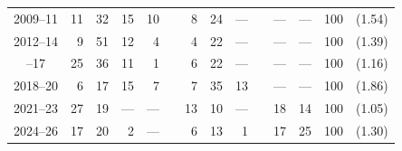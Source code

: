 \documentclass[letter,12pt]{article}
\begin{document}
\begin{table}
{\begin{tabular}{crrrrrrrrrrrrc}
 2009--11&  11 &  32 &  15 &    10    &&   8 &       24 &      --- &&   --- &      ---      & 100 & (1.54) \\
 2012--14&   9 &  51 &  12 &     4    &&   4 &       22 &      --- &&   --- &      ---      & 100 & (1.39) \\ \hdashline
 2015--17&  25 &  36 &  11 &     1    &&   6 &       22 &      --- &&   --- &      ---      & 100 & (1.16) \\
 2018--20&   6 &  17 &  15 &     7    &&   7 &       35 &       13 &&   --- &      ---      & 100 & (1.86) \\
 2021--23&  27 &  19 & --- &   ---    &&  13 &       10 &      --- &&    18 &       14      & 100 & (1.05) \\
 2024--26&  17 &  20 &   2 &   ---    &&   6 &       13 &        1 &&    17 &       25      & 100 & (1.30) \\ 

\end{tabular}}
\end{table}
\end{document}
